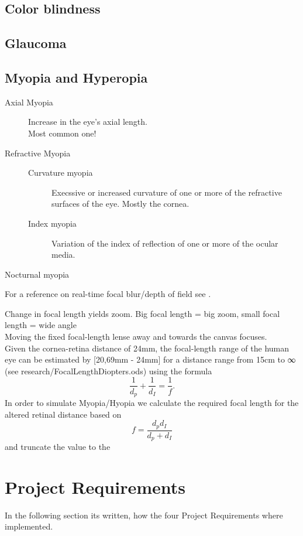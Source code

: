 \documentclass{acm_proc_article-sp}
\begin{document}
\subsection{Color blindness}
\subsection{Glaucoma}
\subsection{Myopia and Hyperopia}
\begin{description}
\item[Axial Myopia]
    Increase in the eye's axial length.\\
    Most common one!
\item[Refractive Myopia]
    \begin{description}
    \item[Curvature myopia]
    Execssive or increased curvature of one or more of the refractive surfaces of the eye. Mostly the cornea.
    \item[Index myopia]
    Variation of the index of reflection of one or more of the ocular media.
    \end{description}
\item[Nocturnal myopia]
\end{description}

For a reference on real-time focal blur/depth of field see \cite{gpugems-DoF, gpugems3-DoF}.

Change in focal length yields zoom. Big focal length = big zoom, small focal length = wide angle\\
Moving the fixed focal-length lense away and towards the canvas focuses. \\
Given the cornea-retina distance of 24mm, the focal-length range of the human eye can be estimated by [20,69mm - 24mm] for a distance range from 15cm to ∞ (see research/FocalLengthDiopters.ods) using the formula
\begin{equation}
    \frac{1}{d_p} + \frac{1}{d_I} = \frac{1}{f}.
\end{equation}
In order to simulate Myopia/Hyopia we calculate the required focal length for the altered retinal distance based on
\begin{equation}
    f = \frac{d_p d_I}{d_p + d_I}
\end{equation}
and truncate the value to the 

\section{Project Requirements}
In the following section its written, how the four Project Requirements where implemented.
\end{document}
